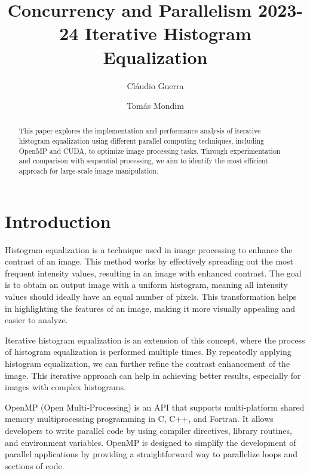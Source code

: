 \documentclass[sigconf]{acmart}
\begin{document}
\title{Concurrency and Parallelism 2023-24 \break Iterative Histogram Equalization}


\author{Cláudio Guerra}

\author{Tomás Mondim}


\begin{abstract}
This paper explores the implementation and performance analysis of iterative histogram equalization using different parallel computing techniques, including OpenMP and CUDA, to optimize image processing tasks. Through experimentation and comparison with sequential processing, we aim to identify the most efficient approach for large-scale image manipulation.
\end{abstract}




\maketitle

\section{Introduction}

Histogram equalization is a technique used in image processing to enhance the contrast of an image. This method works by effectively spreading out the most frequent intensity values, resulting in an image with enhanced contrast. The goal is to obtain an output image with a uniform histogram, meaning all intensity values should ideally have an equal number of pixels. This transformation helps in highlighting the features of an image, making it more visually appealing and easier to analyze.

Iterative histogram equalization is an extension of this concept, where the process of histogram equalization is performed multiple times. By repeatedly applying histogram equalization, we can further refine the contrast enhancement of the image. This iterative approach can help in achieving better results, especially for images with complex histograms.

OpenMP (Open Multi-Processing) is an API that supports multi-platform shared memory multiprocessing programming in C, C++, and Fortran. It allows developers to write parallel code by using compiler directives, library routines, and environment variables. OpenMP is designed to simplify the development of parallel applications by providing a straightforward way to parallelize loops and sections of code.
\end{document}
